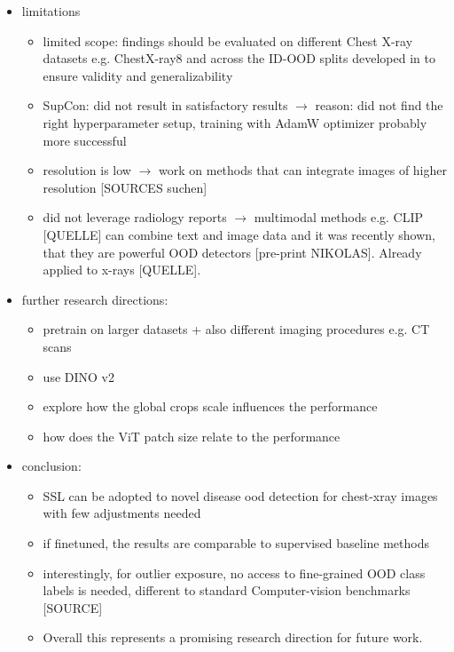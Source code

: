 \begin{itemize}
\begin{itemize}
        \end{itemize}
    \item limitations
        \begin{itemize}
            \item limited scope: findings should be evaluated on different Chest X-ray datasets e.g. ChestX-ray8 \citep{Wang2017} and across the ID-OOD splits developed in \citep{Cao2020} to ensure validity and generalizability
            \item SupCon: did not result in satisfactory results $\rightarrow$ reason: did not find the right hyperparameter setup, training with AdamW optimizer probably more successful
            \item resolution is low $\rightarrow$ work on methods that can integrate images of higher resolution [SOURCES suchen]
            \item did not leverage radiology reports $\rightarrow$ multimodal methods e.g. CLIP [QUELLE] can combine text and image data and it was recently shown, that they are powerful OOD detectors [pre-print NIKOLAS]. Already applied to x-rays [QUELLE].
        \end{itemize} 
    \item further research directions:
        \begin{itemize}
            \item pretrain on larger datasets + also different imaging procedures e.g. CT scans
            \item use DINO v2 
            \item explore how the global crops scale influences the performance
            \item how does the ViT patch size relate to the performance
        \end{itemize}
    \item conclusion:
        \begin{itemize}
            \item SSL can be adopted to novel disease ood detection for chest-xray images with few adjustments needed
            \item if finetuned, the results are comparable to supervised baseline methods
            \item interestingly, for outlier exposure, no access to fine-grained OOD class labels is needed, different to standard Computer-vision benchmarks [SOURCE]
            \item Overall this represents a promising research direction for future work.
        \end{itemize}
\end{itemize}